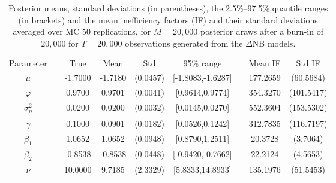 { \renewcommand{\arraystretch}{1.2} 
\begin{table} 
\center 
\begin{tabular}{cc cccc ccc} 
\toprule 
Parameter && True  & Mean & Std & 95\% range && Mean IF & Std IF \\ \cline{1-1}  \cline{3-6} \cline{8-9}
$\mu$   &&  -1.7000  &  -1.7180  &  (0.0457)  &  [-1.8083,-1.6287]  &&  177.2659  &  (60.5684)  \\  
$\varphi$   &&  0.9700  &  0.9701  &  (0.0041)  &  [0.9614,0.9774]  &&  354.3270  &  (101.5417)  \\  
$\sigma^2_{\eta}$   &&  0.0200  &  0.0200  &  (0.0032)  &  [0.0145,0.0270]  &&  552.3604  &  (153.5302)  \\  
$\gamma$   &&  0.1000  &  0.0901  &  (0.0182)  &  [0.0526,0.1242]  &&  312.7835  &  (116.7197)  \\  
$\beta_1$   &&  1.0652  &  1.0652  &  (0.0948)  &  [0.8790,1.2511]  &&  20.3728  &  (3.7064)  \\  
$\beta_2$   &&  -0.8538  &  -0.8538  &  (0.0448)  &  [-0.9420,-0.7662]  &&  22.2124  &  (4.5653)  \\  
$\nu$   &&  10.0000  &  9.7185  &  (2.3329)  &  [5.8333,14.8933]  &&  135.1976  &  (51.5453)  \\  
\bottomrule 
\end{tabular}
 \caption{Posterior means, standard deviations (in parentheses), 
 the 2.5\%--97.5\% quantile ranges (in brackets) and  the mean inefficiency factors (IF) and their standard deviations  averaged over MC $50$ replications, 
 for $M=20,000$ posterior draws after a burn-in of $20,000$ 
for $T=20,000$ observations  generated from the $\Delta$NB models.}
\label{tab:sim_res} 
\end{table}
}